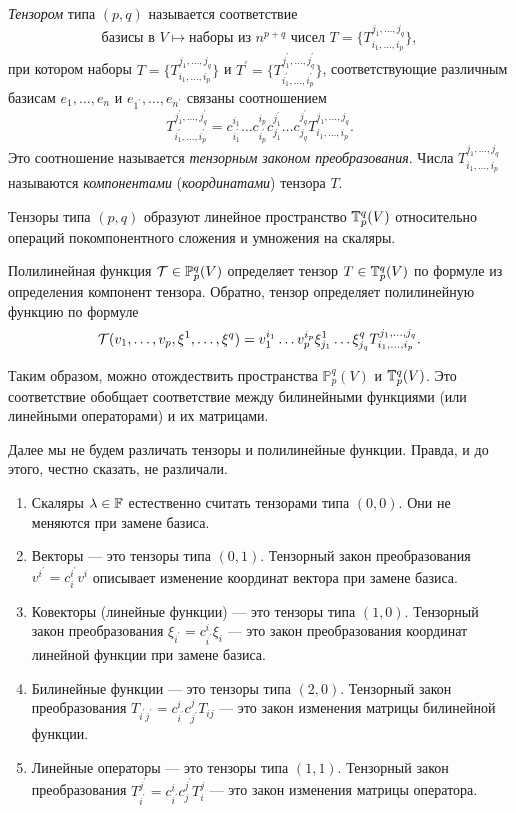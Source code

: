 \begin{definition}
    \textit{Тензором} типа $(p, q)$ называется соответствие
    \[
        \text{базисы в $V$} \mapsto \text{наборы из $n^{p + q}$ чисел $T = \{T_{i_1, \ldots, i_p}^{j_1, \ldots, j_q}\}$},
    \]
    при котором наборы $T = \{T_{i_1, \ldots, i_p}^{j_1, \ldots, j_q}\}$ и $T^\prime = \{T_{i_1^\prime, \ldots, i_p^\prime}^{j_1^\prime, \ldots, j_q^\prime}\}$, соответствующие различным базисам $e_1, \ldots, e_n$ и $e_{1^\prime}, \ldots, e_{n^\prime}$ связаны соотношением
    \[
        T_{i_1^\prime, \ldots, i_p^\prime}^{j_1^\prime, \ldots, j_q^\prime} = c^{i_1}_{i_1^\prime}\ldots c^{i_p}_{i_p^\prime}c^{j_1^\prime}_{j_1}\ldots c^{j_q^\prime}_{j_q}T_{i_1, \ldots, i_p}^{j_1, \ldots, j_q}.
    \]
    Это соотношение называется \textit{тензорным законом преобразования}. Числа $T_{i_1, \ldots, i_p}^{j_1, \ldots, j_q}$ называются \textit{компонентами} (\textit{координатами}) тензора $T$.
\end{definition}

Тензоры типа $(p, q)$ образуют линейное пространство $\mathbb{T}_p^q(V)$ относительно операций покомпонентного сложения и умножения на скаляры.

Полилинейная функция $\mathcal{T} \in \mathbb{P}_p^q(V)$ определяет тензор $T \in \mathbb{T}_p^q(V)$ по формуле из определения компонент тензора. Обратно, тензор определяет полилинейную функцию по формуле
\[
    \mathcal{T}(v_1, \ldots, v_p, \xi^1, \ldots, \xi^q) = v_1^{i_1}\ldots v_p^{i_p}\xi^1_{j_1}\ldots\xi^q_{j_q}T_{i_1, \ldots, i_p}^{j_1, \ldots, j_q}.
\]

Таким образом, можно отождествить пространства $\mathbb{P}_p^q(V)$ и $\mathbb{T}_p^q(V)$. Это соответствие обобщает соответствие между билинейными функциями (или линейными операторами) и их матрицами.

Далее мы не будем различать тензоры и полилинейные функции. Правда, и до этого, честно сказать, не различали.

\begin{example}
    \begin{enumerate}
        \item Скаляры $\lambda \in \mathbb{F}$ естественно считать тензорами типа $(0, 0)$. Они не меняются при замене базиса.
        \item Векторы --- это тензоры типа $(0, 1)$. Тензорный закон преобразования $v^{i^\prime} = c^{i^\prime}_iv^i$ описывает изменение координат вектора при замене базиса.
        \item Ковекторы (линейные функции) --- это тензоры типа $(1, 0)$. Тензорный закон преобразования $\xi_{i^\prime} = c^i_{i^\prime}\xi_i$ --- это закон преобразования координат линейной функции при замене базиса.
        \item Билинейные функции --- это тензоры типа $(2, 0)$. Тензорный закон преобразования $T_{i^\prime j^\prime} = c^i_{i^\prime}c^j_{j^\prime}T_{ij}$ --- это закон изменения матрицы билинейной функции.
        \item Линейные операторы --- это тензоры типа $(1, 1)$. Тензорный закон преобразования $T_{i^\prime}^{j^\prime} = c^i_{i^\prime}c^{j^\prime}_jT_i^j$ --- это закон изменения матрицы оператора.
    \end{enumerate}
\end{example}

